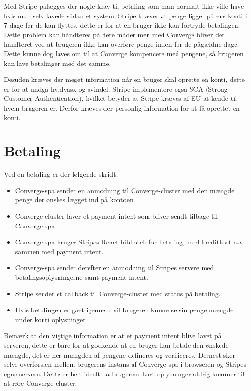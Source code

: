 Med Stripe pålægges der nogle krav til betaling som man normalt ikke ville have hvis man selv lavede sådan et system. Stripe kræver at penge ligger på ens konti i 7 dage før de kan flyttes, dette er for at en bruger ikke kan fortryde betalingen. Dette problem kan håndteres på flere måder men med Converge bliver det håndteret ved at brugeren ikke kan overføre penge inden for de pågældne dage. Dette kunne dog laves om til at Converge kompencere med pengene, så brugeren kan lave betalinger med det samme.

Desuden kræves der meget information når en bruger skal oprette en konti, dette er for at undgå hvidvask og svindel. Stripe implementere også SCA (Strong Customer Authentication), hvilket betyder at Stripe kræves af EU at kende til hvem brugeren er. Derfor kræves der personlig information for at få oprettet en konti.

\section{Betaling}

Ved en betaling er der følgende skridt:

\begin{itemize}
    \item Converge-spa sender en anmodning til Converge-cluster med den mængde penge der ønskes lægget ind på kontoen.
    \item Converge-cluster laver et payment intent som bliver sendt tilbage til Converge-spa.
    \item Converge-spa bruger Stripes React bibliotek for betaling, med kreditkort osv. sammen med payment intent.
    \item Converge-spa sender derefter en anmodning til Stripes servere med betalingsoplysningerne samt payment intent.
    \item Stripe sender et callback til Converge-cluster med status på betaling.
    \item Hvis betalingen er gået igennem vil brugeren kunne se sin penge mængde under konti oplysninger
\end{itemize}

Bemærk at den vigtige information er at et payment intent blive lavet på serveren, dette er bare for at godkende at en bruger kan betale den ønskede mængde, det er her mængden af pengene defineres og verificeres. Dernest sker selve overførslen mellem brugerens instans af Converge-spa i browseren og Stripes egne servere. Dette er helt ideelt da brugerens kort oplysninger aldrig kommer til at røre Converge-cluster.

